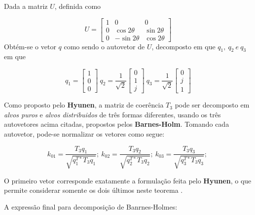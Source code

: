 \documentclass{article}
\begin{document}
Dada a matriz $U$, definida como

    \begin{equation}
        U = \begin{bmatrix}
            1 & 0 & 0 \\
            0 & \cos{2\theta} & \sin{2\theta} \\
            0 & -\sin{2\theta} & \cos{2\theta}
        \end{bmatrix}
    \end{equation} 
Obtém-se o vetor $q$ como sendo o autovetor de $U$, decomposto em que $q_{1}, \  q_{2} \ e \ q_{3}$ em que

    \begin{equation}
        q_{1} =\begin{bmatrix}
            1 \\
            0 \\
            0
        \end{bmatrix} \ 
        q_{2} = \frac{1}{\sqrt{2}}\begin{bmatrix}
            0 \\
            1 \\
            j
        \end{bmatrix} \ 
        q_{3} = \frac{1}{\sqrt{2}}\begin{bmatrix}
            0 \\
            j \\
            1
        \end{bmatrix}
    \end{equation}
    
Como proposto pelo \textbf{Hyunen}, a matriz de coerência $T_{3}$ pode ser decomposto em \textit{alvos puros} e \textit{alvos distribuidos} de três formas diferentes, usando os três autovetores acima citadas, propostos pelos \textbf{Barnes-Holm}. 
Tomando cada autovetor, pode-se normalizar os vetores como segue:

\begin{equation}
    k_{01} = \frac{T_{3}q_{1}}{\sqrt{q_{1}^{T*}T_{3}q_{1}}}; \    
    k_{02} = \frac{T_{3}q_{2}}{\sqrt{q_{2}^{T*}T_{3}q_{2}}}; \    
    k_{03} = \frac{T_{3}q_{3}}{\sqrt{q_{3}^{T*}T_{3}q_{3}}}; \ 
\end{equation}

O primeiro vetor corresponde exatamente a formulação feita pelo \textbf{Hyunen}, o que permite considerar somente os dois últimos neste teorema \cite{jong:2009}.

A expressão final para decomposição de Banrnes-Holmes:
\end{document}
